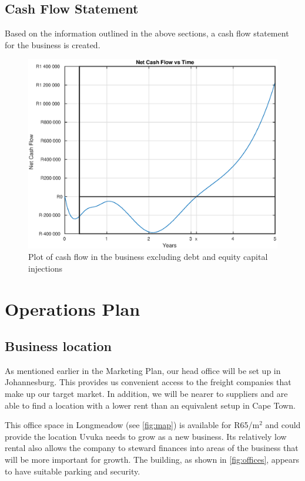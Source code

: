 \section{Cash Flow Statement}

Based on the information outlined in the above sections, a cash flow statement for the business is created.

\begin{figure}[H]
\centering
\includegraphics[width=1\textwidth]{images/nvp_plot}
\vskip10pt
\caption[Cash-flow plot]{Plot of cash flow in the business excluding debt and equity capital injections}
\label{fig:exam}
\end{figure}

\newpage

\chapter{Operations Plan}
\section{Business location}
As mentioned earlier in the Marketing Plan, our head office will be set up in Johannesburg. This provides us convenient access to the freight companies that make up our target market. In addition, we will be nearer to suppliers and are able to find a location with a lower rent than an equivalent setup in Cape Town.

This office space in Longmeadow (see \cref{fig:map}) is available for R65/m$^2$ and could provide the location Uvuka needs to grow as a new business. Its relatively low rental also allows the company to steward finances into areas of the business that will be more important for growth. The building, as shown in \cref{fig:offices}, appears to have suitable parking and security.

